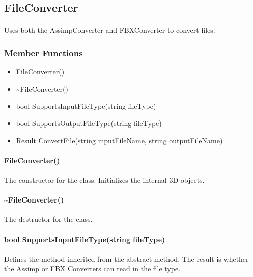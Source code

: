\hypertarget{fileconversion_fileconverter}
{
    \label{fileconversion_fileconverter}
}

\subsection{FileConverter}
    \paragraph{}
        Uses both the AssimpConverter and FBXConverter to convert files.

    \subsubsection{Member Functions}

        \begin{itemize}
            \item FileConverter()
            \item \textasciitilde FileConverter()
            \item bool SupportsInputFileType(string fileType)
            \item bool SupportsOutputFileType(string fileType)
            \item Result ConvertFile(string inputFileName, string outputFileName)
        \end{itemize}

        \paragraph{FileConverter()}
            \hfill \break
            The constructor for the class. Initializes the internal 3D objects.   
        
        \paragraph{\textasciitilde FileConverter()}
            \hfill \break
            The destructor for the class.

        \paragraph{bool SupportsInputFileType(string fileType)}
            \hfill \break
            Defines the method inherited from the abstract method.  The result is whether the Assimp or FBX Converters can read in the file type.

